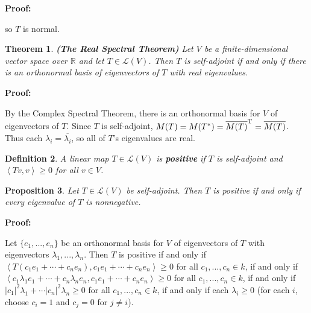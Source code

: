 \documentclass{article}
\theoremstyle{colontheorem}
\newtheorem{theorem}{Theorem}[section]
\newtheorem{proposition}[theorem]{Proposition}
\newtheorem{definition}[theorem]{Definition}
\newenvironment{Theorem}
{
	\begin{mdframed}[backgroundcolor=TheoremOrange!10]
	\begin{theorem}
}
{
	\end{theorem}
	\end{mdframed}
	
	\vspace{.15in}
}
\newenvironment{Proposition}
{
	\begin{mdframed}[backgroundcolor=TheoremOrange!10]
	\begin{proposition}
}
{
	\end{proposition}
	\end{mdframed}
	
	\vspace{.15in}
}
\newenvironment{Def}
{
	\begin{mdframed}[backgroundcolor=DefGreen!10]
	\begin{definition}
}
{
	\end{definition}
	\end{mdframed}
	
	\vspace{.15in}
}
\newenvironment{Proof}
{
	\vspace{-.3in}
	
	\begin{mdframed}[backgroundcolor=ProofPurple!10]
	\textbf{Proof:}%
}
{
	\end{mdframed}
	
	\vspace{.15in}
}
\begin{document}
\begin{Proof}
	so $T$ is normal.
	
\end{Proof}



\begin{Theorem}
	
	\textbf{(The Real Spectral Theorem)} Let $V$ be a finite-dimensional vector space over $\mathbb{R}$ and let $T \in \mathcal{L}(V)$. Then $T$ is self-adjoint if and only if there is an orthonormal basis of eigenvectors of $T$ with real eigenvalues.

\end{Theorem}



\begin{Proof}
	By the Complex Spectral Theorem, there is an orthonormal basis for $V$ of eigenvectors of $T$. Since $T$ is self-adjoint, $M(T) = M(T^*) = \overline{M(T)}^\textnormal{T} = \overline{M(T)}$. Thus each $\lambda_i = \overline{\lambda_i}$, so all of $T$'s eigenvalues are real.
	
\end{Proof}



\begin{Def}
	
	A linear map $T \in \mathcal{L}(V)$ is \textbf{positive} if $T$ is self-adjoint and $\left< Tv, v \right> \geq 0$ for all $v \in V$.
	
\end{Def}



\begin{Proposition}
	
	Let $T \in \mathcal{L}(V)$ be self-adjoint. Then $T$ is positive if and only if every eigenvalue of $T$ is nonnegative.
	
\end{Proposition}



\begin{Proof}
	Let $\{e_1, ..., e_n\}$ be an orthonormal basis for $V$ of eigenvectors of $T$ with eigenvectors $\lambda_1, ..., \lambda_n$. Then $T$ is positive if and only if $\left< T(c_1 e_1 + \cdots + c_n e_n), c_1 e_1 + \cdots + c_n e_n \right> \geq 0$ for all $c_1, ..., c_n \in k$, if and only if $\left< c_1 \lambda_1 e_1 + \cdots + c_n \lambda_n  e_n, c_1 e_1 + \cdots + c_n e_n \right> \geq 0$ for all $c_1, ..., c_n \in k$, if and only if $|c_1|^2 \lambda_1 + \cdots |c_n|^2 \lambda_n \geq 0$ for all $c_1, ..., c_n \in k$, if and only if each $\lambda_i \geq 0$ (for each $i$, choose $c_i = 1$ and $c_j = 0$ for $j \neq i$).
	
\end{Proof}
\end{document}

